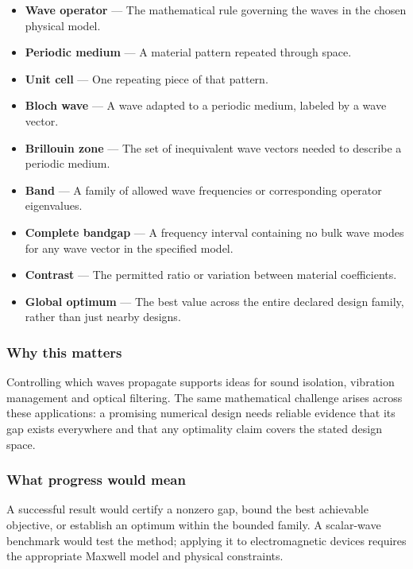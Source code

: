 \documentclass[
  11pt,
]{article}
\begin{document}
\begin{itemize}
\item
  \textbf{Wave operator} --- The mathematical rule governing the waves
  in the chosen physical model.
\item
  \textbf{Periodic medium} --- A material pattern repeated through
  space.
\item
  \textbf{Unit cell} --- One repeating piece of that pattern.
\item
  \textbf{Bloch wave} --- A wave adapted to a periodic medium, labeled
  by a wave vector.
\item
  \textbf{Brillouin zone} --- The set of inequivalent wave vectors
  needed to describe a periodic medium.
\item
  \textbf{Band} --- A family of allowed wave frequencies or
  corresponding operator eigenvalues.
\item
  \textbf{Complete bandgap} --- A frequency interval containing no bulk
  wave modes for any wave vector in the specified model.
\item
  \textbf{Contrast} --- The permitted ratio or variation between
  material coefficients.
\item
  \textbf{Global optimum} --- The best value across the entire declared
  design family, rather than just nearby designs.
\end{itemize}

\subsubsection{Why this matters}

Controlling which waves propagate supports ideas for sound isolation,
vibration management and optical filtering. The same mathematical
challenge arises across these applications: a promising numerical design
needs reliable evidence that its gap exists everywhere and that any
optimality claim covers the stated design space.

\subsubsection{What progress would mean}

A successful result would certify a nonzero gap, bound the best
achievable objective, or establish an optimum within the bounded family.
A scalar-wave benchmark would test the method; applying it to
electromagnetic devices requires the appropriate Maxwell model and
physical constraints.
\end{document}
